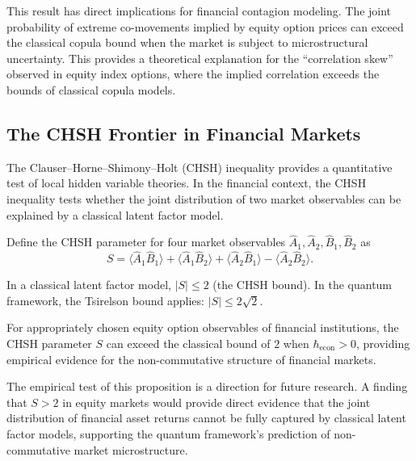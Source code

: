 This result has direct implications for financial contagion modeling. The joint
probability of extreme co-movements implied by equity option prices can exceed
the classical copula bound when the market is subject to microstructural
uncertainty. This provides a theoretical explanation for the ``correlation
skew'' observed in equity index options, where the implied correlation exceeds
the bounds of classical copula models.

\subsection{The CHSH Frontier in Financial Markets}

The Clauser--Horne--Shimony--Holt (CHSH) inequality
\citep{clauser1969proposed} provides a quantitative test of local hidden variable
theories. In the financial context, the CHSH inequality tests whether the joint
distribution of two market observables can be explained by a classical latent
factor model.

Define the CHSH parameter for four market observables
$\hat{A}_1, \hat{A}_2, \hat{B}_1, \hat{B}_2$ as
\begin{equation*}
    S = \langle \hat{A}_1 \hat{B}_1 \rangle + \langle \hat{A}_1 \hat{B}_2 \rangle
    + \langle \hat{A}_2 \hat{B}_1 \rangle - \langle \hat{A}_2 \hat{B}_2 \rangle.
\end{equation*}

In a classical latent factor model, $|S| \leq 2$ (the CHSH bound). In the quantum
framework, the Tsirelson bound \citep{cirelson1980quantum} applies:
$|S| \leq 2\sqrt{2}$.

\begin{proposition}\label{prop:chsh-violation}
For appropriately chosen equity option observables of financial institutions, the
CHSH parameter $S$ can exceed the classical bound of $2$ when
$\hbar_{\mathrm{econ}} > 0$, providing empirical evidence for the non-commutative
structure of financial markets.
\end{proposition}

The empirical test of this proposition is a direction for future research. A
finding that $S > 2$ in equity markets would provide direct evidence that the
joint distribution of financial asset returns cannot be fully captured by
classical latent factor models, supporting the quantum framework's prediction of
non-commutative market microstructure.
